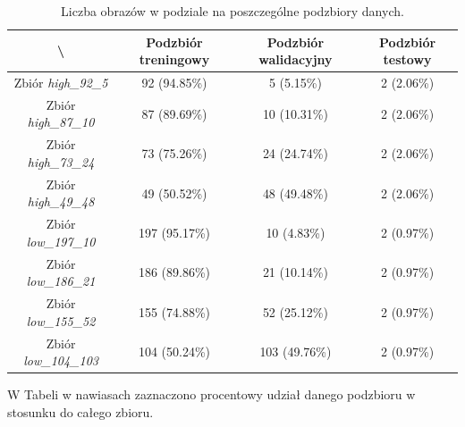 \begin{table}[H]
	\centering
	\caption{Liczba obrazów w podziale na poszczególne podzbiory danych.}
	\vspace{6pt}
	{
    \footnotesize
    \begin{tabular}{|c|c|c|c|}
      \hline \textbackslash & Podzbiór treningowy & Podzbiór walidacyjny & Podzbiór testowy \\
      \hline Zbiór \textit{high\_92\_5} & 92 (94.85\%) & 5 (5.15\%) & 2 (2.06\%) \\
      \hline Zbiór \textit{high\_87\_10} & 87 (89.69\%) & 10 (10.31\%) & 2 (2.06\%) \\
      \hline Zbiór \textit{high\_73\_24} & 73 (75.26\%) & 24 (24.74\%) & 2 (2.06\%) \\
      \hline Zbiór \textit{high\_49\_48} & 49 (50.52\%) & 48 (49.48\%) & 2 (2.06\%) \\
      \hline
      \hline Zbiór \textit{low\_197\_10} & 197 (95.17\%) & 10 (4.83\%) & 2 (0.97\%) \\
      \hline Zbiór \textit{low\_186\_21} & 186 (89.86\%) & 21 (10.14\%) & 2 (0.97\%) \\
      \hline Zbiór \textit{low\_155\_52} & 155 (74.88\%) & 52 (25.12\%) & 2 (0.97\%) \\
      \hline Zbiór \textit{low\_104\_103} & 104 (50.24\%) & 103 (49.76\%) & 2 (0.97\%) \\
      \hline
    \end{tabular}
    \label{Tab:podzial}
	}
	\vspace{0pt}
\end{table}

W Tabeli  w nawiasach zaznaczono procentowy udział danego podzbioru w stosunku do całego zbioru.
